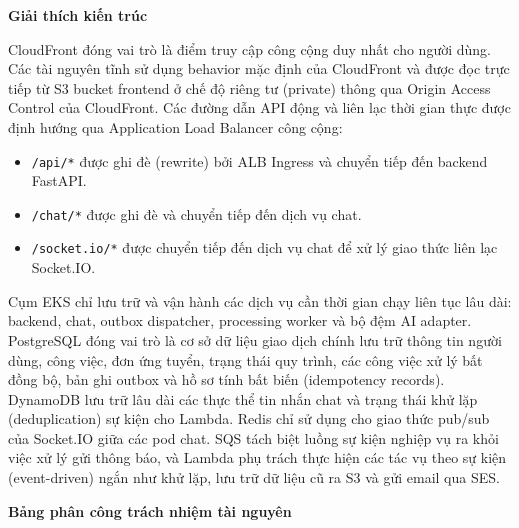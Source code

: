 \vspace{0.5em}\noindent\textbf{Giải thích kiến
trúc}\par

CloudFront đóng vai trò là điểm truy cập công cộng duy nhất cho người
dùng. Các tài nguyên tĩnh sử dụng behavior mặc định của CloudFront và
được đọc trực tiếp từ S3 bucket frontend ở chế độ riêng tư (private)
thông qua Origin Access Control của CloudFront. Các đường dẫn API động
và liên lạc thời gian thực được định hướng qua Application Load Balancer
công cộng:

\begin{itemize}
\tightlist
\item
  \texttt{/\allowbreak{}api/\allowbreak{}*} được ghi đè (rewrite) bởi ALB Ingress và chuyển tiếp
  đến backend FastAPI.
\item
  \texttt{/\allowbreak{}chat/\allowbreak{}*} được ghi đè và chuyển tiếp đến dịch vụ chat.
\item
  \texttt{/\allowbreak{}socket.\allowbreak{}io/\allowbreak{}*} được chuyển tiếp đến dịch vụ chat để xử lý giao
  thức liên lạc Socket.IO.
\end{itemize}

Cụm EKS chỉ lưu trữ và vận hành các dịch vụ cần thời gian chạy liên tục
lâu dài: backend, chat, outbox dispatcher, processing worker và bộ đệm
AI adapter. PostgreSQL đóng vai trò là cơ sở dữ liệu giao dịch chính lưu
trữ thông tin người dùng, công việc, đơn ứng tuyển, trạng thái quy
trình, các công việc xử lý bất đồng bộ, bản ghi outbox và hồ sơ tính bất
biến (idempotency records). DynamoDB lưu trữ lâu dài các thực thể tin
nhắn chat và trạng thái khử lặp (deduplication) sự kiện cho Lambda.
Redis chỉ sử dụng cho giao thức pub/sub của Socket.IO giữa các pod chat.
SQS tách biệt luồng sự kiện nghiệp vụ ra khỏi việc xử lý gửi thông báo,
và Lambda phụ trách thực hiện các tác vụ theo sự kiện (event-driven)
ngắn như khử lặp, lưu trữ dữ liệu cũ ra S3 và gửi email qua SES.

\vspace{0.5em}\noindent\textbf{Bảng phân công trách nhiệm tài
nguyên}\par

